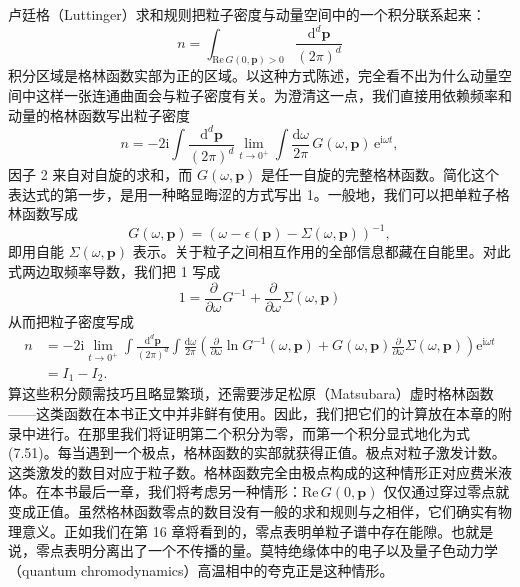 卢廷格（Luttinger）求和规则把粒子密度与动量空间中的一个积分联系起来：
\begin{equation*}
n=\int_{\mathrm{Re}\,G(0,\mathbf{p})>0}\frac{\mathrm{d}^{d}\mathbf{p}}{(2\pi)^{d}}\tag{7.51}
\end{equation*}
积分区域是格林函数实部为正的区域。以这种方式陈述，完全看不出为什么动量空间中这样一张连通曲面会与粒子密度有关。为澄清这一点，我们直接用依赖频率和动量的格林函数写出粒子密度
\begin{equation*}
n=-2\mathrm{i}\int\frac{\mathrm{d}^{d}\mathbf{p}}{(2\pi)^{d}}\lim_{t\to 0^{+}}\int\frac{\mathrm{d}\omega}{2\pi}\,G(\omega,\mathbf{p})\,\mathrm{e}^{\mathrm{i}\omega t},\tag{7.52}
\end{equation*}
因子 2 来自对自旋的求和，而 $G(\omega,\mathbf{p})$ 是任一自旋的完整格林函数。简化这个表达式的第一步，是用一种略显晦涩的方式写出 1。一般地，我们可以把单粒子格林函数写成
\begin{equation*}
G(\omega,\mathbf{p})=(\omega-\epsilon(\mathbf{p})-\Sigma(\omega,\mathbf{p}))^{-1},\tag{7.53}
\end{equation*}
即用自能 $\Sigma(\omega,\mathbf{p})$ 表示。关于粒子之间相互作用的全部信息都藏在自能里。对此式两边取频率导数，我们把 1 写成
\begin{equation*}
1=\frac{\partial}{\partial\omega}G^{-1}+\frac{\partial}{\partial\omega}\Sigma(\omega,\mathbf{p})\tag{7.54}
\end{equation*}
从而把粒子密度写成
\begin{equation*}
\begin{aligned}
n&=-2\mathrm{i}\lim_{t\to 0^{+}}\int\frac{\mathrm{d}^{d}\mathbf{p}}{(2\pi)^{d}}\int\frac{\mathrm{d}\omega}{2\pi}\left(\frac{\partial}{\partial\omega}\ln G^{-1}(\omega,\mathbf{p})+G(\omega,\mathbf{p})\frac{\partial}{\partial\omega}\Sigma(\omega,\mathbf{p})\right)\mathrm{e}^{\mathrm{i}\omega t}\\
&=I_{1}-I_{2}.
\end{aligned}\tag{7.55}
\end{equation*}
算这些积分颇需技巧且略显繁琐，还需要涉足松原（Matsubara）虚时格林函数——这类函数在本书正文中并非鲜有使用。因此，我们把它们的计算放在本章的附录中进行。在那里我们将证明第二个积分为零，而第一个积分显式地化为式 (7.51)。每当遇到一个极点，格林函数的实部就获得正值。极点对粒子激发计数。这类激发的数目对应于粒子数。格林函数完全由极点构成的这种情形正对应费米液体。在本书最后一章，我们将考虑另一种情形：$\mathrm{Re}\,G(0,\mathbf{p})$ 仅仅通过穿过零点就变成正值。虽然格林函数零点的数目没有一般的求和规则与之相伴，它们确实有物理意义。正如我们在第 16 章将看到的，零点表明单粒子谱中存在能隙。也就是说，零点表明分离出了一个不传播的量。莫特绝缘体中的电子以及量子色动力学（quantum chromodynamics）高温相中的夸克正是这种情形。

